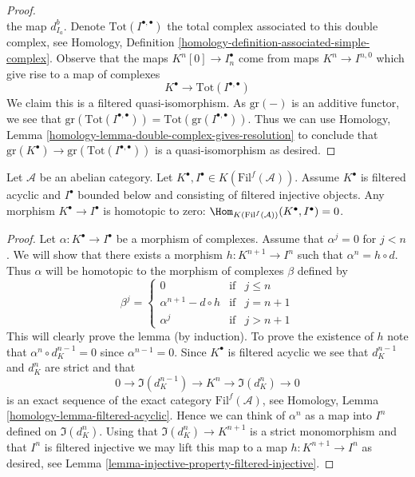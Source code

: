 \begin{proof}
$$$$
the map $d_{I_a}^b$. Denote $\text{Tot}(I^{\bullet, \bullet})$
the total complex associated to this double complex, see
Homology, Definition \ref{homology-definition-associated-simple-complex}.
Observe that the maps $K^n[0] \to I_n^\bullet$ come from maps
$K^n \to I^{n, 0}$ which give rise to a map of complexes
$$
K^\bullet \longrightarrow \text{Tot}(I^{\bullet, \bullet})
$$
We claim this is a filtered quasi-isomorphism.
As $\text{gr}(-)$ is an additive functor, we see that
$\text{gr}(\text{Tot}(I^{\bullet, \bullet})) =
\text{Tot}(\text{gr}(I^{\bullet, \bullet}))$.
Thus we can use
Homology,
Lemma \ref{homology-lemma-double-complex-gives-resolution}
to conclude that
$\text{gr}(K^\bullet) \to \text{gr}(\text{Tot}(I^{\bullet, \bullet}))$
is a quasi-isomorphism as desired.
\end{proof}

\begin{lemma}
\label{lemma-filtered-acyclic-is-zero}
Let $\mathcal{A}$ be an abelian category.
Let $K^\bullet, I^\bullet \in K(\text{Fil}^f(\mathcal{A}))$.
Assume $K^\bullet$ is filtered acyclic and
$I^\bullet$ bounded below and consisting of filtered injective objects.
Any morphism $K^\bullet \to I^\bullet$ is homotopic to zero:
$\Hom_{K(\text{Fil}^f(\mathcal{A}))}(K^\bullet, I^\bullet) = 0$.
\end{lemma}

\begin{proof}
Let $\alpha : K^\bullet \to I^\bullet$ be a morphism of
complexes. Assume that $\alpha^j = 0$ for $j < n$.
We will show that there exists a morphism $h : K^{n + 1} \to I^n$
such that $\alpha^n = h \circ d$. Thus $\alpha$ will be homotopic
to the morphism of complexes $\beta$ defined by
$$
\beta^j =
\left\{
\begin{matrix}
0 & \text{if} & j \leq n \\
\alpha^{n + 1} - d \circ h & \text{if} & j = n + 1 \\
\alpha^j & \text{if} & j > n + 1
\end{matrix}
\right.
$$
This will clearly prove the lemma (by induction).
To prove the existence of $h$ note that
$\alpha^n \circ d_K^{n - 1} = 0$ since
$\alpha^{n - 1} = 0$. Since $K^\bullet$ is filtered acyclic
we see that $d_K^{n - 1}$ and $d_K^n$ are strict and that
$$
0 \to \Im(d_K^{n - 1}) \to K^n \to \Im(d_K^n) \to 0
$$
is an exact sequence of the exact category $\text{Fil}^f(\mathcal{A})$, see
Homology, Lemma \ref{homology-lemma-filtered-acyclic}.
Hence we can think of $\alpha^n$ as a map into $I^n$ defined
on $\Im(d_K^n)$.
Using that $\Im(d_K^n) \to K^{n + 1}$ is a strict monomorphism
and that $I^n$ is filtered injective we may lift this map to a map
$h : K^{n + 1} \to I^n$ as desired, see
Lemma \ref{lemma-injective-property-filtered-injective}.
\end{proof}

